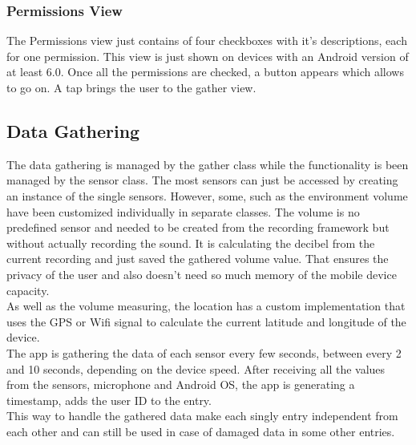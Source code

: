 \subsubsection{Permissions View}
The Permissions view just contains of four checkboxes with it's descriptions, each for one permission. This view is just shown on devices with an Android version of at least 6.0. 
Once all the permissions are checked, a button appears which allows to go on. A tap brings the user to the gather view.

\subsection{Data Gathering}
The data gathering is managed by the gather class while the functionality is been managed by the sensor class. The most sensors can just be accessed by creating an instance of the single sensors. However, some, such as the environment volume have been customized individually in separate classes. The volume is no predefined sensor and needed to be created from the recording framework but without actually recording the sound. It is calculating the decibel from the current recording and just saved the gathered volume value. That ensures the privacy of the user and also doesn't need so much memory of the mobile device capacity.\\
As well as the volume measuring, the location has a custom implementation that uses the GPS or Wifi signal to calculate the current latitude and longitude of the device. \\
The app is gathering the data of each sensor every few seconds, between every 2 and 10 seconds, depending on the device speed. After receiving all the values from the sensors, microphone and Android OS, the app is generating a timestamp, adds the user ID to the entry.\\
This way to handle the gathered data make each singly entry independent from each other and can still be used in case of damaged data in some other entries. 

